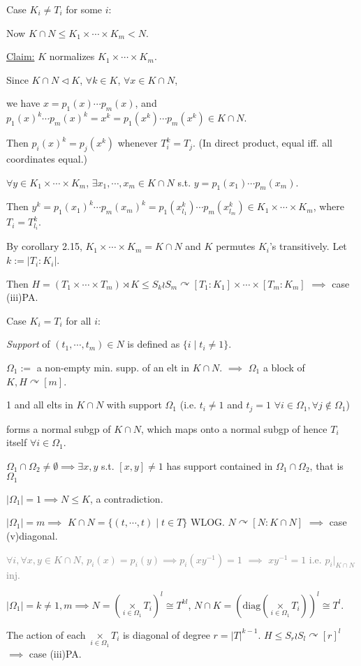 \documentclass[a4paper,11pt]{article}
\begin{document}
\noindent Case $K_i\neq T_i$ for some $i$: 

Now $K\cap N\leq K_1\times\cdots\times K_m < N$.

\underline{Claim:} $K$ normalizes $K_1\times\cdots\times K_m$. 

{\color{gray}
Since $K\cap N\triangleleft K$, $\forall k\in K$, $\forall x\in K\cap N$, 

we have $x=p_1(x)\cdots p_m(x)$, and $p_1(x)^k\cdots p_m(x)^k=x^k=p_1(x^k)\cdots p_m(x^k)\in K\cap N$. 

Then $p_i(x)^k=p_j(x^k)$ whenever $T_i^k=T_j$. (In direct product, equal iff. all coordinates equal.)

$\forall y \in K_1\times\cdots\times K_m$, $\exists x_1,\cdots, x_m\in K\cap N$ s.t. $y=p_1(x_1)\cdots p_m(x_m)$. 

Then $y^k=p_1(x_1)^k\cdots p_m(x_m)^k=p_1(x_{l_1}^k)\cdots p_m(x_{l_m}^k) \in K_1\times\cdots\times K_m$, where $T_i=T_{l_i}^k$.
}

By corollary 2.15, $K_1\times\cdots\times K_m=K\cap N$ and $K$ permutes $K_i$'s transitively. Let $k:=|T_i:K_i|$. 

Then $H=(T_1\times\cdots\times  T_m)\rtimes K\leq S_k\wr S_m\curvearrowright [T_1:K_1]\times\cdots\times[T_m:K_m]$ $\implies$ case (iii)PA.

\noindent Case $K_i= T_i$ for all $i$: 

\textit{Support} of $(t_1,\cdots,t_m)\in N$ is defined as $\{i\mid t_i\neq 1\}$.

$\Omega_1:=$ a non-empty min. supp. of an elt in $K\cap N$. $\implies$ $\Omega_1$ a block of $K,H\curvearrowright [m]$.

{\color{gray}
1 and all elts in $K\cap N$ with support $\Omega_1$ (i.e. $t_i\neq 1$ and $t_j=1$ $\forall i\in\Omega_1, \forall j\notin\Omega_1$) 

forms a normal subgp of $K\cap N$, which maps onto a normal subgp of hence $T_i$ itself $\forall i\in\Omega_1$.

$\Omega_1\cap \Omega_2\neq \emptyset\implies \exists x,y$ s.t. $[x,y]\neq 1$ has support contained in $\Omega_1\cap \Omega_2$, that is $\Omega_1$
}

$|\Omega_1|=1\implies N\leq K$, a contradiction.

$|\Omega_1|=m\implies$ $K\cap N=\{(t,\cdots,t)\mid t\in T\}$ WLOG.  $N\curvearrowright [N:K\cap N]$ $\implies$ case (v)diagonal.

\textcolor{gray}{$\forall i, \forall x, y \in K\cap N$, $p_i(x)=p_i(y)\implies p_i(xy^{-1})=1$ $\implies$ $xy^{-1}=1$ i.e. $p_i|_{K\cap N}$ inj. }


$|\Omega_1|=k\neq 1,m\implies N=\left(\mathop{\times}\limits_{i\in\Omega_1}T_i\right)^{l}\cong T^{kl}$, $N\cap K=\left(\mathrm{diag}\left(\mathop{\times}\limits_{i\in\Omega_1}T_i\right)\right)^l\cong T^l$.

The action of each $\mathop{\times}\limits_{i\in\Omega_1}T_i$ is diagonal of degree $r=|T|^{k-1}$. $H\leq S_r\wr S_l\curvearrowright [r]^l$ $\implies$ case (iii)PA.





\ifx\ChapTwoSecSix\undefined
     
\end{document}

